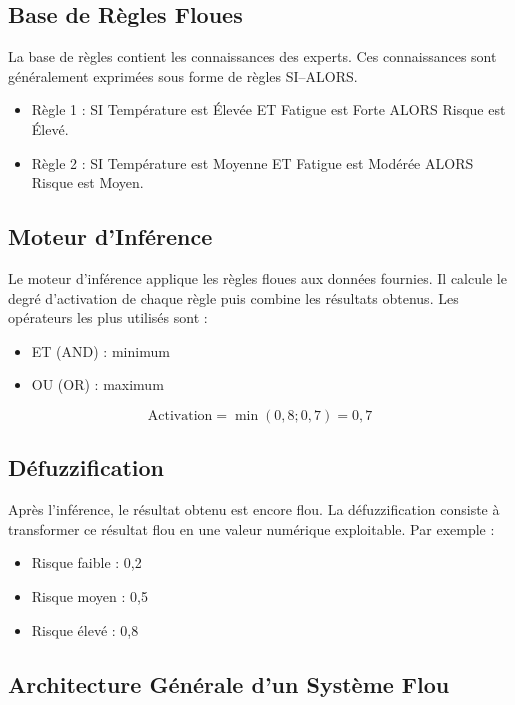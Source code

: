 \documentclass[a4paper,12pt]{report} %
\begin{document}
\subsection{Base de Règles Floues}

La base de règles contient les connaissances des experts. Ces connaissances sont généralement exprimées sous forme de règles SI–ALORS.

\begin{itemize}
\item Règle 1 : SI Température est Élevée ET Fatigue est Forte ALORS Risque est Élevé.
\item Règle 2 : SI Température est Moyenne ET Fatigue est Modérée ALORS Risque est Moyen.
\end{itemize}

\subsection{Moteur d'Inférence}

Le moteur d'inférence applique les règles floues aux données fournies. Il calcule le degré d'activation de chaque règle puis combine les résultats obtenus. Les opérateurs les plus utilisés sont :
\begin{itemize}
\item ET (AND) : minimum
\item OU (OR) : maximum
\end{itemize}

\[
\text{Activation} = \min(0,8 ; 0,7) = 0,7
\]

\subsection{Défuzzification}

Après l'inférence, le résultat obtenu est encore flou. La défuzzification consiste à transformer ce résultat flou en une valeur numérique exploitable. Par exemple :
\begin{itemize}
\item Risque faible : 0,2
\item Risque moyen : 0,5
\item Risque élevé : 0,8
\end{itemize}

\subsection{Architecture Générale d'un Système Flou}
\end{document}
